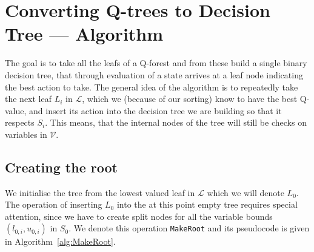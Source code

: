 \section{Converting Q-trees to Decision Tree --- Algorithm}%
\label{app:qTreeConversion}

The goal is to take all the leafs of a Q-forest and from these build a single
binary decision tree, that through evaluation of a state arrives at a leaf node
indicating the best action to take. The general idea of the algorithm is to
repeatedly take the next leaf $L_i$ in $\mathcal{L}$, which we (because of our
sorting) know to have the best Q-value, and insert its action into the decision
tree we are building so that it respects $S_i$. This means, that the internal
nodes of the tree will still be checks on variables in $\mathcal{V}$.

\subsection{Creating the root}

We initialise the tree from the lowest valued leaf in $\mathcal{L}$ which we
will denote $L_0$. The operation of inserting $L_0$ into the at this point empty
tree requires special attention, since we have to create split nodes for all the
variable bounds $(l_{0,i}, u_{0,i})$ in $S_0$. We denote this operation
\texttt{MakeRoot} and its pseudocode is given in Algorithm~\ref{alg:MakeRoot}.

